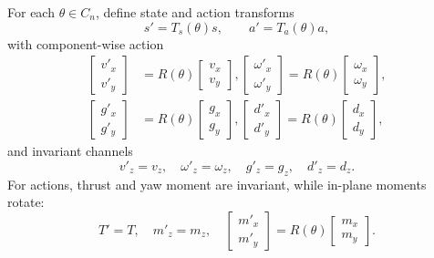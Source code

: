 \documentclass{article}
\begin{document}
For each $\theta\in C_n$, define state and action transforms
\begin{equation}
s'=T_s(\theta)s,\qquad a'=T_a(\theta)a,
\end{equation}
with component-wise action
\begin{equation}
\begin{aligned}
\begin{bmatrix}v'_x\\v'_y\end{bmatrix} &= R(\theta)\begin{bmatrix}v_x\\v_y\end{bmatrix},
\begin{bmatrix}\omega'_x\\\omega'_y\end{bmatrix} = R(\theta)\begin{bmatrix}\omega_x\\\omega_y\end{bmatrix},\\
\begin{bmatrix}g'_x\\g'_y\end{bmatrix} &= R(\theta)\begin{bmatrix}g_x\\g_y\end{bmatrix},
\begin{bmatrix}d'_x\\d'_y\end{bmatrix} = R(\theta)\begin{bmatrix}d_x\\d_y\end{bmatrix},
\end{aligned}
\end{equation}
and invariant channels
\begin{equation}
v'_z=v_z,\quad \omega'_z=\omega_z,\quad g'_z=g_z,\quad d'_z=d_z.
\end{equation}
For actions, thrust and yaw moment are invariant, while in-plane moments rotate:
\begin{equation}
T'=T,\quad m'_z=m_z,\quad
\begin{bmatrix}m'_x\\m'_y\end{bmatrix}=R(\theta)\begin{bmatrix}m_x\\m_y\end{bmatrix}.
\end{equation}
\end{document}
